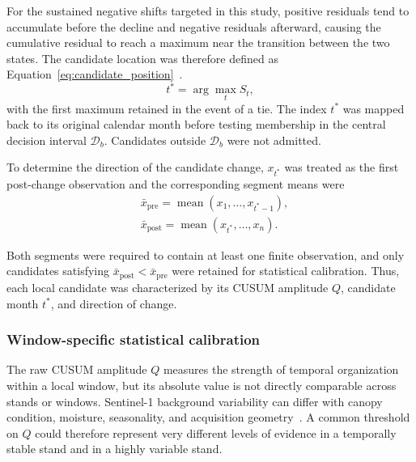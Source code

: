 For the sustained negative shifts targeted in this study, positive residuals tend to accumulate before the decline and negative residuals afterward, causing the cumulative residual to reach a maximum near the transition between the two states. The candidate location was therefore defined as Equation~\eqref{eq:candidate_position}~\citep{Page1954CUSUM,Ygorra2021CuSum}.
\begin{equation}
    t^*
    =
    \arg\max_t S_t ,
    \label{eq:candidate_position}
\end{equation}
with the first maximum retained in the event of a tie. The index $t^*$ was mapped back to its original calendar month before testing membership in the central decision interval $\mathcal{D}_b$. Candidates outside $\mathcal{D}_b$ were not admitted.

To determine the direction of the candidate change, $x_{t^*}$ was treated as the first post-change observation and the corresponding segment means were
\begin{align}
    &\bar{x}_{\mathrm{pre}}
    =
    \operatorname{mean}\!\left(
        x_1,\ldots,x_{t^{*}-1}
    \right),
    \label{eq:pre_change_mean}
    \\
    &\bar{x}_{\mathrm{post}}
    =
    \operatorname{mean}\!\left(
        x_{t^{*}},\ldots,x_n
    \right).
    \label{eq:post_change_mean}
\end{align}

Both segments were required to contain at least one finite observation, and only candidates satisfying $\bar{x}_{\mathrm{post}} < \bar{x}_{\mathrm{pre}}$ were retained for statistical calibration. Thus, each local candidate was characterized by its CUSUM amplitude $Q$, candidate month $t^*$, and direction of change. 

\subsubsection{Window-specific statistical calibration}
\label{sec:windowed_cusum_permutation}

The raw CUSUM amplitude $Q$ measures the strength of temporal organization within a local window, but its absolute value is not directly comparable across stands or windows. Sentinel-1 background variability can differ with canopy condition, moisture, seasonality, and acquisition geometry~\citep{BorlafMena2023Seasonality,vanDerWoude2024S1Disturbance}. A common threshold on $Q$ could therefore represent very different levels of evidence in a temporally stable stand and in a highly variable stand.

